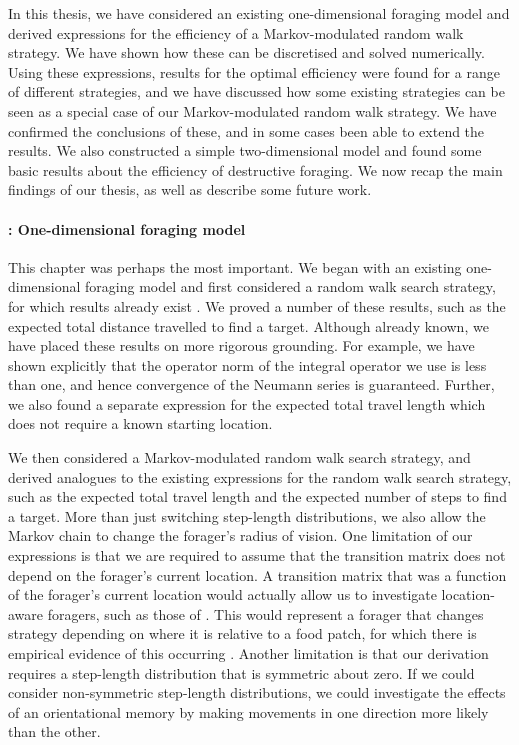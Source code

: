 



In this thesis, we have considered an existing one-dimensional foraging model and derived expressions for the efficiency of a Markov-modulated random walk strategy. We have shown how these can be discretised and solved numerically. Using these expressions, results for the optimal efficiency were found for a range of different strategies, and we have discussed how some existing strategies can be seen as a special case of our Markov-modulated random walk strategy. We have confirmed the conclusions of these, and in some cases been able to extend the results. We also constructed a simple two-dimensional model and found some basic results about the efficiency of destructive foraging. We now recap the main findings of our thesis, as well as describe some future work.

\paragraph{: One-dimensional foraging model}
This chapter was perhaps the most important. We began with an existing one-dimensional foraging model and first considered a random walk search strategy, for which results already exist \cite{Bartumeus_2013}. We proved a number of these results, such as the expected total distance travelled to find a target. Although already known, we have placed these results on more rigorous grounding. For example, we have shown explicitly that the operator norm of the integral operator we use is less than one, and hence convergence of the Neumann series is guaranteed. Further, we also found a separate expression for the expected total travel length which does not require a known starting location.

We then considered a Markov-modulated random walk search strategy, and derived analogues to the existing expressions for the random walk search strategy, such as the expected total travel length and the expected number of steps to find a target. More than just switching step-length distributions, we also allow the Markov chain to change the forager's radius of vision. One limitation of our expressions is that we are required to assume that the transition matrix does not depend on the forager's current location. A transition matrix that was a function of the forager's current location would actually allow us to investigate location-aware foragers, such as those of \cite{Nolting_2013}. This would represent a forager that changes strategy depending on where it is relative to a food patch, for which there is empirical evidence of this occurring \cite{Patterson_2017}. Another limitation is that our derivation requires a step-length distribution that is symmetric about zero. If we could consider non-symmetric step-length distributions, we could investigate the effects of an orientational memory by making movements in one direction more likely than the other.

